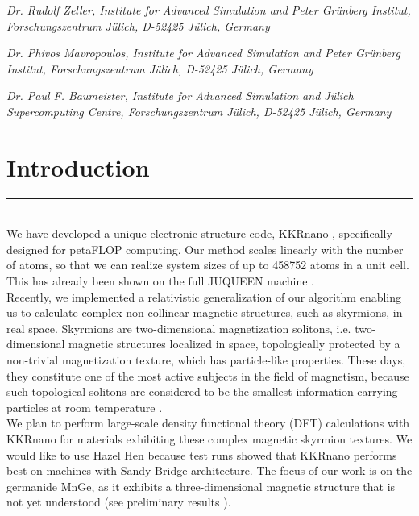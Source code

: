 \documentclass [a4paper, 12pt]{article}
\begin{document}
\phantom{MM} \textit{Dr. Rudolf Zeller,
Institute for Advanced Simulation and Peter Gr\"unberg Institut, Forschungszentrum J\"ulich, D-52425 J\"ulich, Germany
}

\phantom{MM} \textit{Dr. Phivos Mavropoulos,
Institute for Advanced Simulation and Peter Gr\"unberg Institut, Forschungszentrum J\"ulich, D-52425 J\"ulich, Germany
}

\phantom{MM} \textit{Dr. Paul F. Baumeister,
Institute for Advanced Simulation and J\"ulich Supercomputing Centre, Forschungszentrum J\"ulich, D-52425 J\"ulich, Germany
}


\newpage

\vfill
\tableofcontents
\vfill

\newpage



\section{Introduction}
\rule{\textwidth}{0.4pt}\\


We have developed a unique electronic structure code, 
KKRnano \cite{zeller_towards_2008,thiess_massively_2012},
specifically designed for petaFLOP computing. Our method scales linearly
with the number of atoms, so that we can realize system sizes of up to 
458752 atoms in a unit cell. This has already been shown on the full JUQUEEN
machine \cite{brommel_juqueen_2017}.
\\
Recently, we implemented a relativistic generalization of our algorithm 
enabling us to calculate complex non-collinear magnetic structures, such as skyrmions,
in real space. Skyrmions are two-dimensional magnetization solitons, i.e. two-dimensional
magnetic structures localized in space, topologically protected by a non-trivial
magnetization texture, which has particle-like properties. 
These days, they constitute one of the most active subjects in the field of 
magnetism, because such topological solitons are considered to be the smallest 
information-carrying particles at room temperature \cite{fert_skyrmions_2013,castelvecchi_strange_2017}. 
\\
We plan to perform large-scale density functional theory (DFT) calculations with 
KKRnano for materials exhibiting these complex magnetic skyrmion textures. We would like to use Hazel Hen
because test runs showed that KKRnano performs best on machines with Sandy Bridge
architecture.
The focus of our work is on the germanide MnGe, as it exhibits a three-dimensional magnetic structure
that is not yet understood (see preliminary results
\cite{tanigaki_real-space_2015,rybakov_new_2016,bornemann_investigation_2017}).
\end{document}
